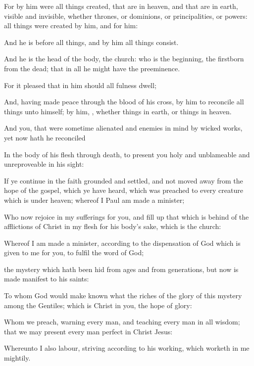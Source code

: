 {For
by
him
were all
things
created, that
are
in
heaven,
and that
are
in
earth,
visible
and
invisible,
whether
{}
thrones,
or
dominions,
or
principalities,
or
powers: all
things were
created
by
him,
and
for
him:

And
he
is
before all
things,
and
by
him all
things
consist.

And
he
is the
head of the
body, the
church:
who
is the
beginning, the
firstborn
from the
dead;
that
in
all
{}
he
might have the
preeminence.

For it
pleased
{} that
in
him
should
all
fulness
dwell;

And, having made
peace
through the
blood of
his
cross,
by
him to
reconcile all
things
unto
himself;
by
him,
{},
whether
{}
things
in
earth,
or
things
in
heaven.

And
you, that
were
sometime
alienated
and
enemies
in
{}
mind
by
wicked
works,
yet
now hath he
reconciled

In the
body of
his
flesh
through
death, to
present
you
holy
and
unblameable
and
unreproveable
in
his
sight:

If ye continue
in the
faith
grounded
and
settled,
and
{}
not moved
away
from the
hope of the
gospel,
which ye have
heard,
{} which was
preached
to
every
creature which is
under
heaven;
whereof
I
Paul am
made a
minister;

Who
now
rejoice
in
my
sufferings
for
you,
and fill
up that which is
behind of the
afflictions of
Christ
in
my
flesh
for
his
body’s
sake,
which
is the
church:

Whereof
I am
made a
minister, according
to the
dispensation of
God which is
given to
me
for
you, to
fulfil the
word of
God;

 the
mystery which hath been
hid
from
ages
and
from
generations,
but
now is made
manifest
to
his
saints:

To
whom
God
would make
known
what
{} the
riches of the
glory of
this
mystery
among the
Gentiles;
which
is
Christ
in
you, the
hope of
glory:

Whom
we
preach,
warning
every
man,
and
teaching
every
man
in
all
wisdom;
that we may
present
every
man
perfect
in
Christ
Jesus:

Whereunto
I
also
labour,
striving according
to
his
working, which
worketh
in
me
mightily.




}
